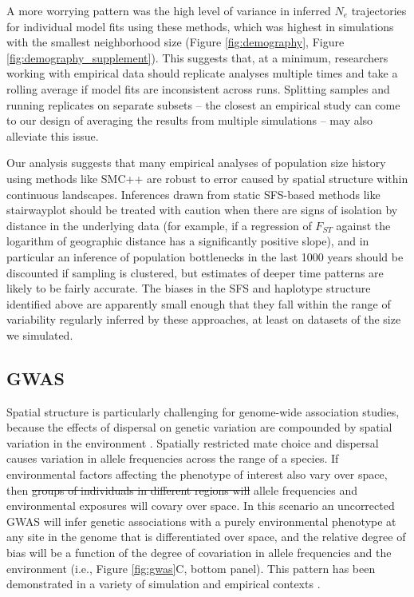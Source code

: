 \documentclass[10pt,twoside,lineno,hidelinks]{preprint} %
\providecommand{\DIFdel}[1]{{\protect\color{red}\sout{#1}}}                      %
\providecommand{\DIFaddbegin}{} %
\providecommand{\DIFaddend}{} %
\providecommand{\DIFdelbegin}{} %
\providecommand{\DIFdelend}{} %
\begin{document}
\DIFaddend A more worrying pattern was the high level of variance in inferred $N_{e}$ trajectories for individual model fits using these methods, which was highest in simulations with the smallest neighborhood size (Figure \ref{fig:demography}, Figure \ref{fig:demography_supplement}). This suggests that, at a minimum, researchers working with empirical data should replicate analyses multiple times and take a rolling average if model fits are inconsistent across runs. Splitting samples and running replicates on separate subsets -- the closest an empirical study can come to our design of averaging the results from multiple simulations -- may also alleviate this issue.  

Our analysis suggests that many empirical analyses of population size history using methods like SMC++ are robust to error caused by spatial structure within continuous landscapes. Inferences drawn from static SFS-based methods like stairwayplot should be treated with caution when there are signs of isolation by distance in the underlying data (for example, if a regression of $F_{ST}$ against the logarithm of geographic distance has a significantly positive slope), and in particular an inference of population bottlenecks in the last 1000 years should be discounted if sampling is clustered, but estimates of deeper time patterns are likely to be fairly accurate. The biases in the SFS and haplotype structure identified above \citep[see also][]{Wakeley1999,Chikhi2010,Stadler2009} are apparently small enough that they fall within the range of variability regularly inferred by these approaches, at least on datasets of the size we simulated.  

\subsection{GWAS}

Spatial structure is particularly challenging for genome-wide association studies, because the effects of dispersal on genetic variation are compounded by spatial variation in the environment \citep{Mathieson2012}. Spatially restricted mate choice and dispersal causes variation in allele frequencies across the range of a species. If environmental factors affecting the phenotype of interest also vary over space, then \DIFdelbegin \DIFdel{groups of individuals in different regions will }\DIFdelend allele frequencies and environmental exposures will covary over space. \DIFaddbegin {}
\DIFaddend In this scenario an uncorrected GWAS will infer genetic associations with a purely environmental phenotype at any site in the genome that is differentiated over space, and the relative degree of bias will be a function of the degree of covariation in allele frequencies and the environment (i.e., Figure \ref{fig:gwas}C, bottom panel). This pattern has been demonstrated in a variety of simulation and empirical contexts \citep{Price2006,Yu2006,Young2018,Mathieson2012,Kang2008,Kang2010,Bulik-Sullivan2015,Berg2018,Sohail2018}. 
\end{document}
